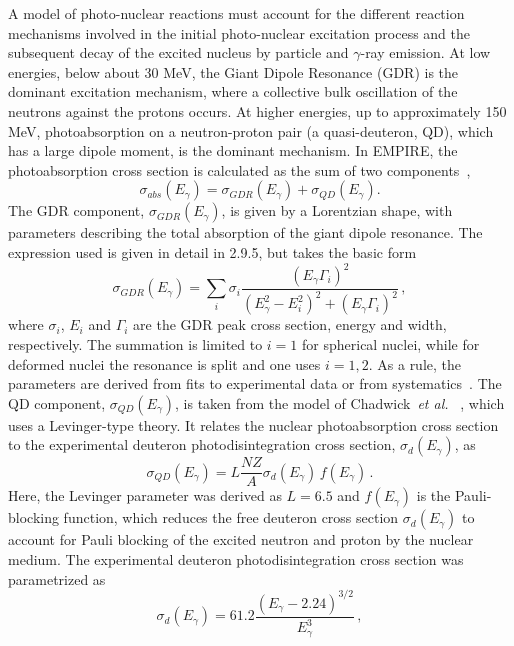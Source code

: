 A model of photo-nuclear reactions must account for the different reaction
mechanisms involved in the initial photo-nuclear excitation process and the
subsequent decay of the excited nucleus by particle and $\gamma$-ray
emission. At low energies, below about 30 MeV, the Giant Dipole Resonance
(GDR) is the dominant excitation mechanism, where a collective bulk
oscillation of the neutrons against the protons occurs. At higher energies,
up to approximately 150 MeV, photoabsorption on a neutron-proton pair (a
quasi-deuteron, QD), which has a large dipole moment, is the dominant
mechanism. In EMPIRE, the photoabsorption cross section is calculated as the
sum of two components~\cite{PHNuc},
\begin{equation}
\sigma_{abs}(E_{\gamma})=\sigma_{GDR}(E_{\gamma})+\sigma_{QD}(E_{\gamma}).
\end{equation}
The GDR component, $\sigma_{GDR}(E_{\gamma})$, is given by a Lorentzian
shape, with parameters describing the total absorption of the giant dipole
resonance. The expression used is given in detail in 2.9.5, but takes the
basic form
\begin{equation}
\sigma_{GDR}(E_{\gamma})=\sum_{i}\sigma_{i}%
\frac{(E_{\gamma}\Gamma_{i})^{2}}{(E_{\gamma}^{2}-E_{i}^{2})^{2}+(E_{\gamma}%
\Gamma_{i})^{2}}\,,
\end{equation}
\noindent where $\sigma_{i}$, $E_{i}$ and $\Gamma_{i}$ are the GDR peak
cross section, energy and width, respectively. The summation is limited to $%
i=1$ for spherical nuclei, while for deformed nuclei the resonance is split
and one uses $i=1,2$. As a rule, the parameters are derived from fits to
experimental data or from systematics~\cite{RIPL2}. The QD component, $%
\sigma_{QD}(E_{\gamma})$, is taken from the model of Chadwick~\emph{et al.}~%
\cite{chadQD}, which uses a Levinger-type theory. It relates the nuclear
photoabsorption cross section to the experimental deuteron
photodisintegration cross section, $\sigma_{d}(E_{\gamma})$, as
\begin{equation}
\sigma_{QD}(E_{\gamma})=L\frac{NZ}{A}\sigma_{d}(E_{\gamma})\,
f(E_{\gamma})\,.
\end{equation}
Here, the Levinger parameter was derived as $L=6.5$ and $f(E_{\gamma})$ is
the Pauli-blocking function, which reduces the free deuteron cross section $%
\sigma_{d}(E_{\gamma})$ to account for Pauli blocking of the excited neutron
and proton by the nuclear medium. The experimental deuteron
photodisintegration cross section was parametrized as
\begin{equation}
\sigma_{d}(E_{\gamma})=61.2\frac{(E_{\gamma}-2.24)^{3/2}}{E_{\gamma}^{3}}\,,
\end{equation}
